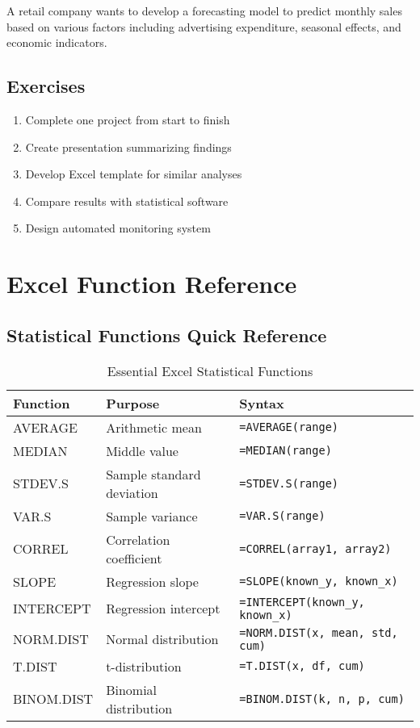 \documentclass[12pt,a4paper]{book}
\begin{document}
A retail company wants to develop a forecasting model to predict monthly sales based on various factors including advertising expenditure, seasonal effects, and economic indicators.

\section{Exercises}

\begin{enumerate}
    \item Complete one project from start to finish
    \item Create presentation summarizing findings
    \item Develop Excel template for similar analyses
    \item Compare results with statistical software
    \item Design automated monitoring system
\end{enumerate}

\appendix

\chapter{Excel Function Reference}

\section{Statistical Functions Quick Reference}

\begin{table}[H]
\centering
\caption{Essential Excel Statistical Functions}
\begin{tabular}{@{}lll@{}}
\toprule
\textbf{Function} & \textbf{Purpose} & \textbf{Syntax} \\
\midrule
AVERAGE & Arithmetic mean & \texttt{=AVERAGE(range)} \\
MEDIAN & Middle value & \texttt{=MEDIAN(range)} \\
STDEV.S & Sample standard deviation & \texttt{=STDEV.S(range)} \\
VAR.S & Sample variance & \texttt{=VAR.S(range)} \\
CORREL & Correlation coefficient & \texttt{=CORREL(array1, array2)} \\
SLOPE & Regression slope & \texttt{=SLOPE(known\_y, known\_x)} \\
INTERCEPT & Regression intercept & \texttt{=INTERCEPT(known\_y, known\_x)} \\
NORM.DIST & Normal distribution & \texttt{=NORM.DIST(x, mean, std, cum)} \\
T.DIST & t-distribution & \texttt{=T.DIST(x, df, cum)} \\
BINOM.DIST & Binomial distribution & \texttt{=BINOM.DIST(k, n, p, cum)} \\
\bottomrule
\end{tabular}
\end{table}
\end{document}
